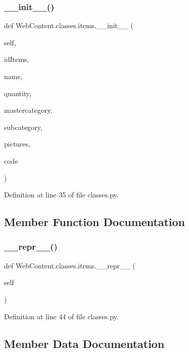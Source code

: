 \subsubsection{\texorpdfstring{\+\_\+\+\_\+init\+\_\+\+\_\+()}{\_\_init\_\_()}}
{\footnotesize\ttfamily def Web\+Content.\+classes.\+items.\+\_\+\+\_\+init\+\_\+\+\_\+ (\begin{DoxyParamCaption}\item[{}]{self,  }\item[{}]{id\+Items,  }\item[{}]{name,  }\item[{}]{quantity,  }\item[{}]{mastercategory,  }\item[{}]{subcategory,  }\item[{}]{pictures,  }\item[{}]{code }\end{DoxyParamCaption})}



Definition at line 35 of file classes.\+py.



\subsection{Member Function Documentation}
\mbox{\label{class_web_content_1_1classes_1_1items_af090fcd951f16fc9e653dd0ca161dbcb}} 
\subsubsection{\texorpdfstring{\+\_\+\+\_\+repr\+\_\+\+\_\+()}{\_\_repr\_\_()}}
{\footnotesize\ttfamily def Web\+Content.\+classes.\+items.\+\_\+\+\_\+repr\+\_\+\+\_\+ (\begin{DoxyParamCaption}\item[{}]{self }\end{DoxyParamCaption})}



Definition at line 44 of file classes.\+py.



\subsection{Member Data Documentation}
\mbox{\label{class_web_content_1_1classes_1_1items_a0b093c44310dcd97c97580ef744ab1cd}} 
